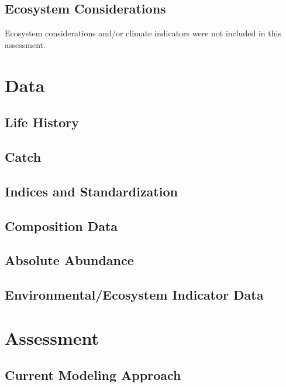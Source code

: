 \documentclass[
  letterpaper,
]{article}
\begin{document}
\subsection{Ecosystem
Considerations}\label{sec-ecosystem-considerations}

Ecosystem considerations and/or climate indicators were not included in
this assessment.

\newpage{}

\section{Data}\label{sec-data}

\subsection{Life History}\label{sec-life-history}

\subsection{Catch}\label{sec-catch}

\subsection{Indices and
Standardization}\label{sec-indices-and-standardization}

\subsection{Composition Data}\label{sec-composition-data}

\subsection{Absolute Abundance}\label{sec-absolute-abundance}

\subsection{Environmental/Ecosystem Indicator
Data}\label{sec-environmental-ecosystem-indicator-data}

\newpage{}

\section{Assessment}\label{sec-assmt-config}

\subsection{Current Modeling
Approach}\label{sec-current-modeling-approach}
\end{document}

